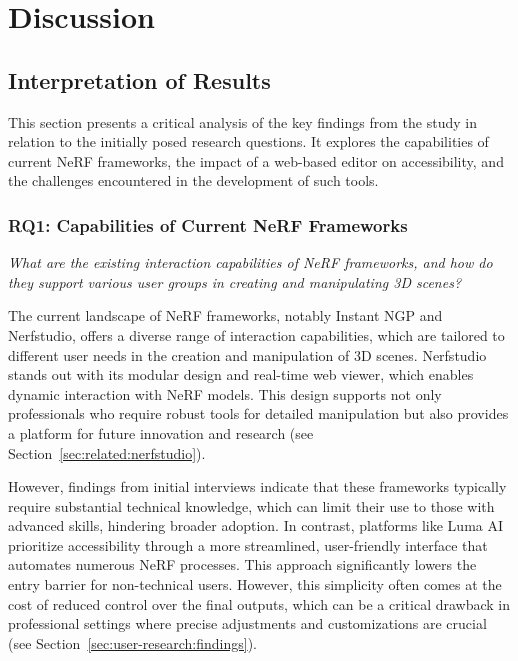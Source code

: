 %
\chapter{Discussion}
\label{sec:discussion}

\section{Interpretation of Results}
\label{sec:discussion:results}

This section presents a critical analysis of the key findings from the study in relation to the initially posed research questions. It explores the capabilities of current NeRF frameworks, the impact of a web-based editor on accessibility, and the challenges encountered in the development of such tools.

\subsection*{RQ1: Capabilities of Current NeRF Frameworks}

\emph{What are the existing interaction capabilities of NeRF frameworks, and how do they support various user groups in creating and manipulating 3D scenes?}

The current landscape of NeRF frameworks, notably Instant NGP and Nerfstudio, offers a diverse range of interaction capabilities, which are tailored to different user needs in the creation and manipulation of 3D scenes.
Nerfstudio stands out with its modular design and real-time web viewer, which enables dynamic interaction with NeRF models.
This design supports not only professionals who require robust tools for detailed manipulation but also provides a platform for future innovation and research (see Section~\ref{sec:related:nerfstudio}).

However, findings from initial interviews indicate that these frameworks typically require substantial technical knowledge, which can limit their use to those with advanced skills, hindering broader adoption.
In contrast, platforms like Luma AI prioritize accessibility through a more streamlined, user-friendly interface that automates numerous NeRF processes.
This approach significantly lowers the entry barrier for non-technical users.
However, this simplicity often comes at the cost of reduced control over the final outputs, which can be a critical drawback in professional settings where precise adjustments and customizations are crucial (see Section~\ref{sec:user-research:findings}).

